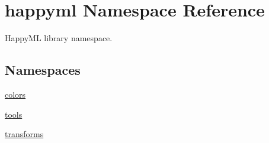 \hypertarget{namespacehappyml}{}\section{happyml Namespace Reference}
\label{namespacehappyml}


Happy\+ML library namespace.  


\subsection*{Namespaces}
\begin{DoxyCompactItemize}
\item 
 \hyperlink{namespacehappyml_1_1colors}{colors}
\item 
 \hyperlink{namespacehappyml_1_1tools}{tools}
\item 
 \hyperlink{namespacehappyml_1_1transforms}{transforms}
\end{DoxyCompactItemize}
